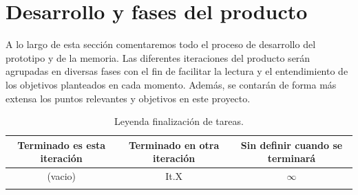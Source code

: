 \chapter{Desarrollo y fases del producto}
A lo largo de esta sección comentaremos todo el proceso de desarrollo del prototipo y de la 
memoria. Las diferentes iteraciones del producto serán agrupadas en diversas fases con el fin
de facilitar la lectura y el entendimiento de los objetivos planteados en cada momento. Además,
se contarán de forma más extensa los puntos relevantes y objetivos en este proyecto.

\begin{longtable}[c]{|c|c|c|}
\hline
Terminado es esta iteración & Terminado en otra iteración & Sin definir cuando se terminará \\ 
\hline
			(vacio)			&             It.X            &             $\infty$            \\ 
\hline
\caption{Leyenda finalización de tareas.}
\end{longtable}

